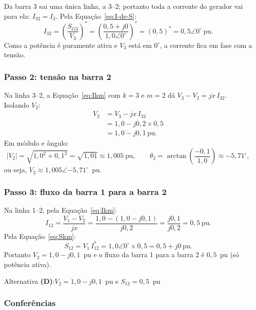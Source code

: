 \documentclass[a4paper,11pt]{article}
\numberwithin{equation}{section}
\numberwithin{figure}{section}
\numberwithin{table}{section}
\begin{document}
Da barra 3 sai uma única linha, a 3--2; portanto toda a corrente do
gerador vai para ela: $I_{32} = I_3$. Pela Equação~\eqref{eq:I-de-S}:
\[
  I_{32} = \left(\frac{S_{G3}}{V_3}\right)^{\!*}
         = \left(\frac{0{,}5 + j0}{1{,}0\angle 0^\circ}\right)^{\!*}
         = (0{,}5)^{*}
         = 0{,}5\angle 0^\circ~\text{pu}.
\]
Como a potência é puramente ativa e $V_3$ está em $0^\circ$, a corrente fica
em fase com a tensão.

\subsubsection{Passo 2: tensão na barra 2}

Na linha 3--2, a Equação~\eqref{eq:Ikm} com $k = 3$ e $m = 2$ dá $V_3 - V_2
= jx\,I_{32}$. Isolando $V_2$:
\begin{align*}
  V_2 &= V_3 - jx\,I_{32} \\
      &= 1{,}0 - j0{,}2 \times 0{,}5 \\
      &= 1{,}0 - j0{,}1~\text{pu}.
\end{align*}
Em módulo e ângulo:
\[
  |V_2| = \sqrt{1{,}0^{2} + 0{,}1^{2}} = \sqrt{1{,}01} \approx 1{,}005~\text{pu},
  \qquad
  \theta_2 = \arctan\!\left(\frac{-0{,}1}{1{,}0}\right) \approx -5{,}71^\circ,
\]
ou seja, $V_2 \approx 1{,}005\angle{-5{,}71^\circ}$~pu.

\subsubsection{Passo 3: fluxo da barra 1 para a barra 2}

Na linha 1--2, pela Equação~\eqref{eq:Ikm}:
\[
  I_{12} = \frac{V_1 - V_2}{jx}
         = \frac{1{,}0 - (1{,}0 - j0{,}1)}{j0{,}2}
         = \frac{j0{,}1}{j0{,}2}
         = 0{,}5~\text{pu}.
\]
Pela Equação~\eqref{eq:Skm}:
\[
  S_{12} = V_1\,I_{12}^{*} = 1{,}0\angle 0^\circ \times 0{,}5
         = 0{,}5 + j0~\text{pu}.
\]
Portanto $V_2 = 1{,}0 - j0{,}1$~pu e o fluxo da barra 1 para a barra 2 é
$0{,}5$~pu (só potência ativa).

\begin{resposta}
  \centering
  Alternativa \textbf{(D)}:\quad $V_2 = 1{,}0 - j0{,}1$~pu \quad e \quad
  $S_{12} = 0{,}5$~pu
\end{resposta}

\subsubsection{Conferências}
\end{document}
